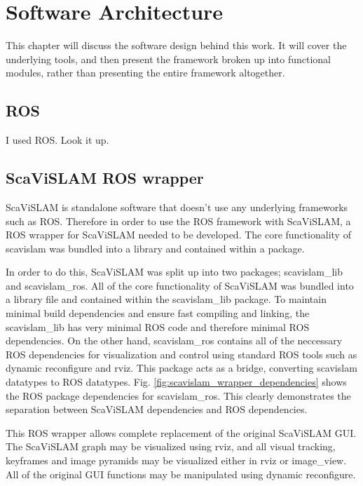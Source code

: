 \chapter{Software Architecture}
\label{chapter:architecture}

This chapter will discuss the software design behind this work.  It will cover the underlying tools, and then present the framework broken up into functional modules, rather than presenting the entire framework altogether.

\section{ROS}

I used ROS.  Look it up.

\section{ScaViSLAM ROS wrapper}

ScaViSLAM is standalone software that doesn't use any underlying frameworks such as ROS.  Therefore in order to use the ROS framework with ScaViSLAM, a ROS wrapper for ScaViSLAM needed to be developed.  The core functionality of scavislam was bundled into a library and contained within a package.

In order to do this, ScaViSLAM was split up into two packages; scavislam\_lib and scavislam\_ros.  All of the core functionality of ScaViSLAM was bundled into a library file and contained within the scavislam\_lib package.  To maintain minimal build dependencies and ensure fast compiling and linking, the scavislam\_lib has very minimal ROS code and therefore minimal ROS dependencies.  On the other hand, scavislam\_ros contains all of the neccessary ROS dependencies for visualization and control using standard ROS tools such as dynamic reconfigure and rviz.  This package acts as a bridge, converting scavislam datatypes to ROS datatypes. Fig. \ref{fig:scavislam_wrapper_dependencies} shows the ROS package dependencies for scavislam\_ros.  This clearly demonstrates the separation between ScaViSLAM dependencies and ROS dependencies.

This ROS wrapper allows complete replacement of the original ScaViSLAM GUI.  The ScaViSLAM graph may be visualized using rviz, and all visual tracking, keyframes and image pyramids may be visualized either in rviz or image\_view.  All of the original GUI functions may be manipulated using dynamic reconfigure.

